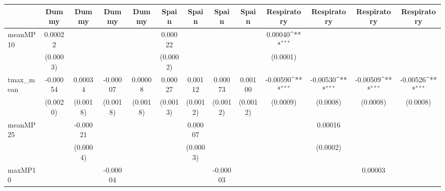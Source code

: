 {
\def\sym#1{\ifmmode^{#1}\else\(^{#1}\)\fi}
\begin{tabular}{l*{12}{c}}
\toprule
            &\multicolumn{1}{c}{Dummy}&\multicolumn{1}{c}{Dummy}&\multicolumn{1}{c}{Dummy}&\multicolumn{1}{c}{Dummy}&\multicolumn{1}{c}{Spain}&\multicolumn{1}{c}{Spain}&\multicolumn{1}{c}{Spain}&\multicolumn{1}{c}{Spain}&\multicolumn{1}{c}{Respiratory}&\multicolumn{1}{c}{Respiratory}&\multicolumn{1}{c}{Respiratory}&\multicolumn{1}{c}{Respiratory}\\
\midrule
meanMP10    &     0.00022         &                     &                     &                     &     0.00022         &                     &                     &                     &     0.00040\sym{***}&                     &                     &                     \\
            &    (0.0003)         &                     &                     &                     &    (0.0002)         &                     &                     &                     &    (0.0001)         &                     &                     &                     \\
tmax\_mean   &    -0.00054         &     0.00034         &    -0.00007         &     0.00008         &     0.00027         &     0.00112         &     0.00073         &     0.00100         &    -0.00590\sym{***}&    -0.00530\sym{***}&    -0.00509\sym{***}&    -0.00526\sym{***}\\
            &    (0.0020)         &    (0.0018)         &    (0.0018)         &    (0.0018)         &    (0.0013)         &    (0.0012)         &    (0.0012)         &    (0.0012)         &    (0.0009)         &    (0.0008)         &    (0.0008)         &    (0.0008)         \\
meanMP25    &                     &    -0.00021         &                     &                     &                     &     0.00007         &                     &                     &                     &     0.00016         &                     &                     \\
            &                     &    (0.0004)         &                     &                     &                     &    (0.0003)         &                     &                     &                     &    (0.0002)         &                     &                     \\
maxMP10     &                     &                     &    -0.00004         &                     &                     &                     &    -0.00003         &                     &                     &                     &     0.00003         &                     \\

\end{tabular}}
